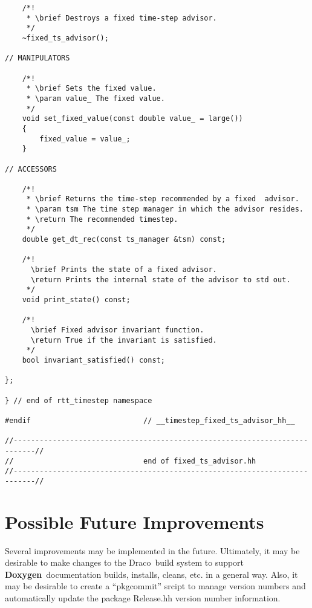 \documentclass[11pt]{nmemo}
\newcommand{\draco}{{\normalfont\sffamily Draco}}
\newcommand{\doxy}{{\normalfont\bfseries Doxygen}}
\begin{document}
\begin{verbatim}
    /*!
     * \brief Destroys a fixed time-step advisor.
     */
    ~fixed_ts_advisor();

// MANIPULATORS
    
    /*!
     * \brief Sets the fixed value.
     * \param value_ The fixed value.
     */
    void set_fixed_value(const double value_ = large())
    { 
        fixed_value = value_;
    }

// ACCESSORS

    /*!
     * \brief Returns the time-step recommended by a fixed  advisor.
     * \param tsm The time step manager in which the advisor resides.
     * \return The recommended timestep.
     */
    double get_dt_rec(const ts_manager &tsm) const;
    
    /*! 
      \brief Prints the state of a fixed advisor.
      \return Prints the internal state of the advisor to std out.
     */
    void print_state() const;
    
    /*! 
      \brief Fixed advisor invariant function.
      \return True if the invariant is satisfied.
     */
    bool invariant_satisfied() const;

};

} // end of rtt_timestep namespace

#endif                          // __timestep_fixed_ts_advisor_hh__

//---------------------------------------------------------------------------//
//                              end of fixed_ts_advisor.hh
//---------------------------------------------------------------------------//

\end{verbatim}


\section{Possible Future Improvements}

Several improvements may be implemented in the future. 
Ultimately, it may be desirable  to make changes to the \draco\
build system to support \doxy\ documentation builds, installs, cleans,
etc. in a general way. 
Also, it may be desirable to create a ``pkgcommit'' srcipt to manage
version numbers and automatically update the package Release.hh version
number information. 

\end{document}
